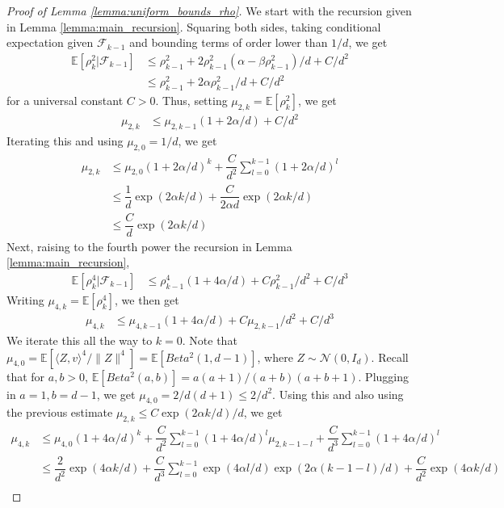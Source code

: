 \documentclass[12pt]{article}
\def\gF{{\mathcal{F}}}
\def\gN{{\mathcal{N}}}
\newcommand{\E}{\mathbb{E}}
\begin{document}
\begin{proof}[Proof of Lemma \ref{lemma:uniform_bounds_rho}] We start with the recursion given in Lemma \ref{lemma:main_recursion}. Squaring both sides, taking conditional expectation given $\gF_{k-1}$ and bounding terms of order lower than $1/d$, we get
\begin{align*}
    \E[\rho_k^2|\gF_{k-1}] &\leq \rho_{k-1}^2 + 2\rho_{k-1}^2(\alpha-\beta\rho^2_{k-1})/d + C/d^2\\
    &\leq \rho^2_{k-1} + 2\alpha\rho^2_{k-1}/d + C/d^2
\end{align*}for a universal constant $C>0$. Thus, setting $\mu_{2,k}=\E[\rho^2_k]$, we get
\begin{align*}
    \mu_{2,k}&\leq \mu_{2,k-1}(1 + 2\alpha/d) + C/d^2
\end{align*}Iterating this and using $\mu_{2,0}=1/d$, we get
\begin{align*}
    \mu_{2,k} &\leq \mu_{2,0}(1+2\alpha/d)^k + \dfrac{C}{d^2}\sum_{l=0}^{k-1} (1+2\alpha/d)^l \\
    &\leq \dfrac{1}{d}\exp\left(2\alpha k/d\right) + \dfrac{C}{2\alpha d}\exp(2\alpha k/d)\\
    &\leq \dfrac{C}{d}\exp(2\alpha k/d)
\end{align*}Next, raising to the fourth power the recursion in Lemma \ref{lemma:main_recursion}, 
\begin{align*}
    \E[\rho^4_k|\gF_{k-1}] &\leq \rho^4_{k-1}(1 + 4\alpha/d) + C\rho^2_{k-1}/d^2 + C/d^3
\end{align*}Writing $\mu_{4,k}=\E[\rho^4_k]$, we then get
\begin{align*}
    \mu_{4,k} &\leq \mu_{4,k-1}(1+4\alpha/d) + C\mu_{2,k-1}/d^2 + C/d^3
\end{align*}We iterate this all the way to $k=0$. Note that $\mu_{4,0}=\E[\langle Z,v\rangle^4/\|Z\|^4]=\E[Beta^2(1,d-1)]$, where $Z\sim \gN(0, I_d)$. Recall that for $a,b>0$, $\E[Beta^2(a,b)]=a(a+1)/(a+b)(a+b+1)$. Plugging in $a=1,b=d-1$, we get $\mu_{4,0}=2/d(d+1)\leq 2/d^2$. Using this and also using the previous estimate $\mu_{2,k}\leq C\exp(2\alpha k/d)/d$, we get
\begin{align*}
    \mu_{4,k} &\leq \mu_{4,0}\left(1 + 4\alpha/d\right)^k + \dfrac{C}{d^2}\sum_{l=0}^{k-1}\left(1 + 4\alpha/d\right)^l\mu_{2,k-1-l} + \dfrac{C}{d^3}\sum_{l=0}^{k-1}(1+4\alpha/d)^l \\
    &\leq \dfrac{2}{d^2}\exp(4\alpha k/d) + \dfrac{C}{d^3}\sum_{l=0}^{k-1}\exp(4\alpha l/d)\exp(2\alpha(k-1-l)/d) + \dfrac{C}{d^2}\exp(4\alpha k/d)\\

\end{align*}
\end{proof}
\end{document}
